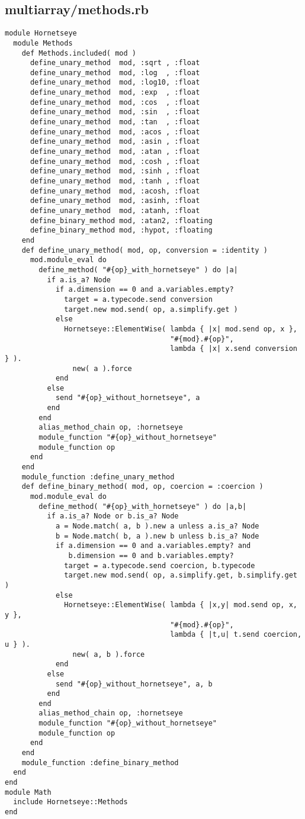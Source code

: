 \subsection{multiarray/methods.rb}\label{cha:multiarray-methods-rb}
\begin{lstlisting}
module Hornetseye
  module Methods
    def Methods.included( mod )
      define_unary_method  mod, :sqrt , :float
      define_unary_method  mod, :log  , :float
      define_unary_method  mod, :log10, :float
      define_unary_method  mod, :exp  , :float
      define_unary_method  mod, :cos  , :float
      define_unary_method  mod, :sin  , :float
      define_unary_method  mod, :tan  , :float
      define_unary_method  mod, :acos , :float
      define_unary_method  mod, :asin , :float
      define_unary_method  mod, :atan , :float
      define_unary_method  mod, :cosh , :float
      define_unary_method  mod, :sinh , :float
      define_unary_method  mod, :tanh , :float
      define_unary_method  mod, :acosh, :float
      define_unary_method  mod, :asinh, :float
      define_unary_method  mod, :atanh, :float
      define_binary_method mod, :atan2, :floating
      define_binary_method mod, :hypot, :floating
    end
    def define_unary_method( mod, op, conversion = :identity )
      mod.module_eval do
        define_method( "#{op}_with_hornetseye" ) do |a|
          if a.is_a? Node
            if a.dimension == 0 and a.variables.empty?
              target = a.typecode.send conversion
              target.new mod.send( op, a.simplify.get )
            else
              Hornetseye::ElementWise( lambda { |x| mod.send op, x },
                                       "#{mod}.#{op}",
                                       lambda { |x| x.send conversion } ).
                new( a ).force
            end
          else
            send "#{op}_without_hornetseye", a
          end
        end
        alias_method_chain op, :hornetseye
        module_function "#{op}_without_hornetseye"
        module_function op
      end
    end
    module_function :define_unary_method
    def define_binary_method( mod, op, coercion = :coercion )
      mod.module_eval do
        define_method( "#{op}_with_hornetseye" ) do |a,b|
          if a.is_a? Node or b.is_a? Node
            a = Node.match( a, b ).new a unless a.is_a? Node
            b = Node.match( b, a ).new b unless b.is_a? Node
            if a.dimension == 0 and a.variables.empty? and
               b.dimension == 0 and b.variables.empty?
              target = a.typecode.send coercion, b.typecode
              target.new mod.send( op, a.simplify.get, b.simplify.get )
            else
              Hornetseye::ElementWise( lambda { |x,y| mod.send op, x, y },
                                       "#{mod}.#{op}",
                                       lambda { |t,u| t.send coercion, u } ).
                new( a, b ).force
            end
          else
            send "#{op}_without_hornetseye", a, b
          end
        end
        alias_method_chain op, :hornetseye
        module_function "#{op}_without_hornetseye"
        module_function op
      end
    end
    module_function :define_binary_method
  end
end
module Math
  include Hornetseye::Methods
end
\end{lstlisting}
